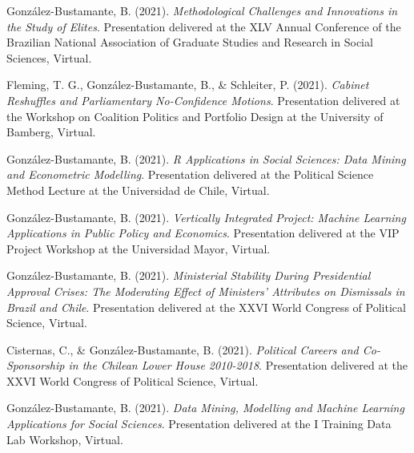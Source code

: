 \begin{publications}
\begin{benumerate}{77}
\item{\small González-Bustamante, B. (2021). {\itshape Methodological Challenges and Innovations in the Study of Elites}. Presentation delivered at the XLV Annual Conference of the Brazilian National Association of Graduate Studies and Research in Social Sciences, Virtual.}\vspace{1mm}

\item{\small Fleming, T. G., González-Bustamante, B., \& Schleiter, P. (2021). {\itshape Cabinet Reshuffles and Parliamentary No-Confidence Motions}. Presentation delivered at the Workshop on Coalition Politics and Portfolio Design at the University of Bamberg, Virtual.}\vspace{1mm}

\item{\small González-Bustamante, B. (2021). {\itshape R Applications in Social Sciences: Data Mining and Econometric Modelling}. Presentation delivered at the Political Science Method Lecture at the Universidad de Chile, Virtual.}\vspace{1mm}

\item{\small González-Bustamante, B. (2021). {\itshape Vertically Integrated Project: Machine Learning Applications in Public Policy and Economics}. Presentation delivered at the VIP Project Workshop at the Universidad Mayor, Virtual.}\vspace{1mm}

\item{\small González-Bustamante, B. (2021). {\itshape Ministerial Stability During Presidential Approval Crises: The Moderating Effect of Ministers' Attributes on Dismissals in Brazil and Chile}. Presentation delivered at the XXVI World Congress of Political Science, Virtual.}\vspace{1mm}

\item{\small Cisternas, C., \& González-Bustamante, B. (2021). {\itshape Political Careers and Co-Sponsorship in the Chilean Lower House 2010-2018}. Presentation delivered at the XXVI World Congress of Political Science, Virtual.}\vspace{1mm}

\item{\small González-Bustamante, B. (2021). {\itshape Data Mining, Modelling and Machine Learning Applications for Social Sciences}. Presentation delivered at the I Training Data Lab Workshop, Virtual.}\vspace{1mm}


\end{benumerate}
\end{publications}
